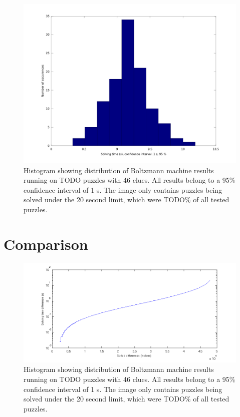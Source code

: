 \documentclass[a4paper,11pt]{kth-mag}
\begin{document}
\begin{figure}[here] 
\centering
\includegraphics[width=12cm]{images/boltzmanndistribution.png}
\caption{Histogram showing distribution of Boltzmann machine results running on TODO puzzles with 46 clues. All results belong to a 95\% confidence interval of 1 s. The image only contains puzzles being solved under the 20 second limit, which were TODO\% of all tested puzzles.}
\label{fig:boltzmannDistribution}
\end{figure}

\FloatBarrier
\section{Comparison}
\label{sec:comparisonAnalysis}

\begin{figure}[here] 
\centering
\includegraphics[width=15cm]{images/comparison.png}
\caption{Histogram showing distribution of Boltzmann machine results running on TODO puzzles with 46 clues. All results belong to a 95\% confidence interval of 1 s. The image only contains puzzles being solved under the 20 second limit, which were TODO\% of all tested puzzles.}
\label{fig:boltzmannDistribution}
\end{figure}
\end{document}
